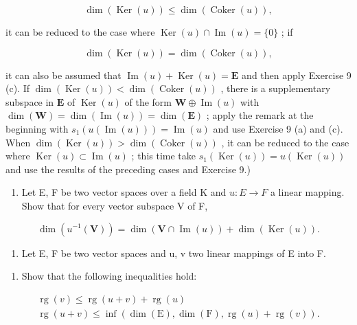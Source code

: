 \[
\dim (\operatorname{Ker} (u)) \leqslant \dim (\operatorname{Coker} (u)),
\]

it can be reduced to the case where \(\operatorname{Ker}(u) \cap \operatorname{Im}(u) = \{0\}\) ; if

\[
\dim (\operatorname{Ker} (u)) = \dim (\operatorname{Coker} (u)),
\]

it can also be assumed that \(\operatorname{Im}(u) + \operatorname{Ker}(u) = \mathbf{E}\) and then apply Exercise 9 (c). If \(\dim (\operatorname {Ker}(u)) < \dim (\operatorname {Coker}(u))\) , there is a supplementary subspace in \(\mathbf{E}\) of \(\operatorname {Ker}(u)\) of the form \(\mathbf{W} \oplus \operatorname{Im}(u)\) with \(\dim (\mathbf{W}) = \dim (\operatorname {Im}(u)) = \dim (\mathbf{E})\) ; apply the remark at the beginning with \(s_1(u(\operatorname {Im}(u))) = \operatorname{Im}(u)\) and use Exercise 9 (a) and (c). When \(\dim (\operatorname {Ker}(u)) > \dim (\operatorname {Coker}(u))\) , it can be reduced to the case where \(\operatorname{Ker}(u) \subset \operatorname{Im}(u)\) ; this time take \(s_1(\operatorname{Ker}(u)) = u(\operatorname{Ker}(u))\) and use the results of the preceding cases and Exercise 9.)

\begin{enumerate}
\def\labelenumi{\arabic{enumi}.}
\setcounter{enumi}{10}
\tightlist
\item
  Let E, F be two vector spaces over a field K and \(u: E \rightarrow F\) a linear mapping. Show that for every vector subspace V of F,
\end{enumerate}

\[
\dim (u ^ {- 1} (\mathbf {V})) = \dim (\mathbf {V} \cap \operatorname{Im} (u)) + \dim (\operatorname{Ker} (u)).
\]

\begin{enumerate}
\def\labelenumi{\arabic{enumi}.}
\setcounter{enumi}{11}
\tightlist
\item
  Let E, F be two vector spaces and u, v two linear mappings of E into F.
\end{enumerate}

\begin{enumerate}
\def\labelenumi{(\alph{enumi})}
\tightlist
\item
  Show that the following inequalities hold:
\end{enumerate}

\[
\begin{array}{c} \operatorname{rg} (v) \leqslant \operatorname{rg} (u + v) + \operatorname{rg} (u) \\ \operatorname{rg} (u + v) \leqslant \inf (\dim (\mathrm{E}), \dim (\mathrm{F}), \operatorname{rg} (u) + \operatorname{rg} (v)). \end{array}
\]


